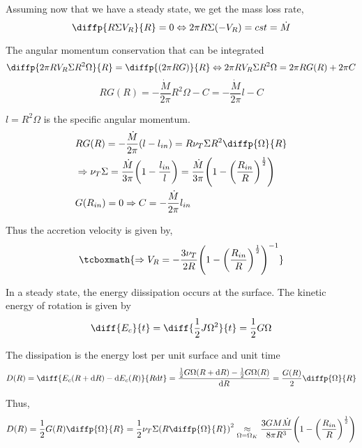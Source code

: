 \documentclass[10pt,a4paper,english,draft]{article}
\let\originalleft\left
\let\originalright\right
\renewcommand{\left}{\mathopen{}\mathclose\bgroup\originalleft}
\renewcommand{\right}{\aftergroup\egroup\originalright}
\begin{document}
Assuming now that we have a steady state, we get the mass loss rate,
\begin{equation}
    \diffp{R \Sigma V_R}{R} = 0 \Leftrightarrow 2 \pi R \Sigma (- V_R) = cst = \dot{M}
\end{equation}

The angular momentum conservation that can be integrated
\begin{equation}
    \diffp{2 \pi R V_R \Sigma R^2 \Omega}{R} = \diffp{(2 \pi R G)}{R} \Leftrightarrow 2 \pi R V_R \Sigma R^2 \Omega = 2 \pi R G(R) + 2 \pi C
\end{equation}
\begin{equation*}
    R G(R) = - \frac{\dot{M}}{2 \pi} R^2 \Omega - C = - \frac{\dot{M}}{2 \pi} l - C
\end{equation*}

$l = R^2 \Omega$ is the specific angular momentum.
\begin{align*}
    & RG(R) = - \frac{\dot{M}}{2 \pi} (l - l_{in}) = R \nu_T \Sigma R^2 \diffp{\Omega}{R} \\
    & \Rightarrow \nu_T \Sigma = \frac{\dot{M}}{3 \pi} \left(1 - \frac{l_{in}}{l}\right) =
    \frac{\dot{M}}{3 \pi} \left(1 - \left(\frac{R_{in}}{R}\right)^\frac{1}{2}\right) \\
    &G(R_{in}) = 0 \Rightarrow C = - \frac{\dot{M}}{2 \pi} l_{in}
\end{align*}

Thus the accretion velocity is given by,
\begin{equation}
    \tcboxmath{
        \Rightarrow V_R = - \frac{3 \nu_T}{2 R} \left(1 - \left(\frac{R_{in}}{R}\right)^\frac{1}{2}\right)^{-1}
    }
\end{equation}

In a steady state, the energy diissipation occurs at the surface. The kinetic
energy of rotation is given by
\begin{equation*}
    \diff{E_c}{t} = \diff{\frac{1}{2} J \Omega^2}{t} = \frac{1}{2} G \Omega
\end{equation*}

The dissipation is the energy lost per unit surface and unit time
\begin{equation*}
    D(R) = \diff{E_c(R+\d{R}) - \d{E_c(R)}}{R \d{t}} = \frac{\frac{1}{2} G \Omega(R+\d{R}) - \frac{1}{2} G \Omega(R)}{\d{R}} = \frac{G(R)}{2} \diffp{\Omega}{R}
\end{equation*}

Thus,
\begin{equation*}
    D(R) = \frac{1}{2} G(R) \diffp{\Omega}{R} = \frac{1}{2} \nu_T \Sigma \left( R \diffp{\Omega}{R} \right)^2 \underset{\Omega = \Omega_K}{\approx}
    \frac{3 G M \dot{M}}{8 \pi R^3} \left(1 - \left(\frac{R_{in}}{R}\right)^\frac{1}{2}\right)
\end{equation*}
\end{document}
